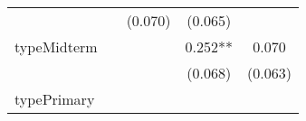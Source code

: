 \documentclass[]{article}
\begin{document}
\begin{longtable}[]{@{}lcccc@{}}
\begin{minipage}[t]{0.12\columnwidth}
\strut
\end{minipage} & \begin{minipage}[t]{0.13\columnwidth}\centering\strut
\strut
\end{minipage} & \begin{minipage}[t]{0.14\columnwidth}\centering\strut
(0.070)\strut
\end{minipage} & \begin{minipage}[t]{0.14\columnwidth}\centering\strut
(0.065)\strut
\end{minipage}\tabularnewline
\begin{minipage}[t]{0.26\columnwidth}\raggedright\strut
typeMidterm\strut
\end{minipage} & \begin{minipage}[t]{0.12\columnwidth}\centering\strut
\strut
\end{minipage} & \begin{minipage}[t]{0.13\columnwidth}\centering\strut
\strut
\end{minipage} & \begin{minipage}[t]{0.14\columnwidth}\centering\strut
0.252**\strut
\end{minipage} & \begin{minipage}[t]{0.14\columnwidth}\centering\strut
0.070\strut
\end{minipage}\tabularnewline
\begin{minipage}[t]{0.26\columnwidth}\raggedright\strut
\strut
\end{minipage} & \begin{minipage}[t]{0.12\columnwidth}\centering\strut
\strut
\end{minipage} & \begin{minipage}[t]{0.13\columnwidth}\centering\strut
\strut
\end{minipage} & \begin{minipage}[t]{0.14\columnwidth}\centering\strut
(0.068)\strut
\end{minipage} & \begin{minipage}[t]{0.14\columnwidth}\centering\strut
(0.063)\strut
\end{minipage}\tabularnewline
\begin{minipage}[t]{0.26\columnwidth}\raggedright\strut
typePrimary\strut
\end{minipage} & \begin{minipage}[t]{0.12\columnwidth}\centering\strut
\strut
\end{minipage} & \begin{minipage}[t]{0.13\columnwidth}\centering\strut

\end{minipage}
\end{longtable}
\end{document}
